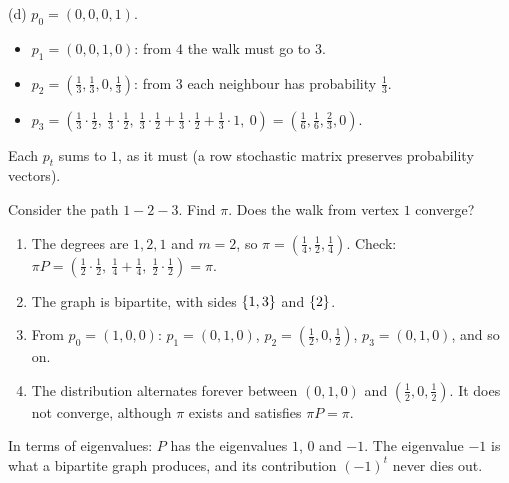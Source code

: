 \begin{exercisebox}
\begin{wsolution}
    (d) $p_0 = (0, 0, 0, 1)$.
    \begin{itemize}
        \item $p_1 = (0, 0, 1, 0)$: from $4$ the walk must go to $3$.
        \item $p_2 = \left(\frac{1}{3}, \frac{1}{3}, 0, \frac{1}{3}\right)$: from $3$ each
              neighbour has probability $\frac{1}{3}$.
        \item $p_3 = \left(\frac{1}{3} \cdot \frac{1}{2},\ \frac{1}{3} \cdot \frac{1}{2},\
                  \frac{1}{3} \cdot \frac{1}{2} + \frac{1}{3} \cdot \frac{1}{2} + \frac{1}{3} \cdot 1,\ 0\right)
                  = \left(\frac{1}{6}, \frac{1}{6}, \frac{2}{3}, 0\right)$.
    \end{itemize}
    Each $p_t$ sums to $1$, as it must (a row stochastic matrix preserves probability vectors).
\end{wsolution}
\end{exercisebox}

\begin{exercisebox}
\begin{pproblem}\label{pp:path}
    Consider the path $1 - 2 - 3$. Find $\pi$. Does the walk from vertex $1$ converge?
\end{pproblem}
\tcblower
\begin{wsolution}
    \leavevmode
    \begin{enumerate}
        \item The degrees are $1, 2, 1$ and $m = 2$, so
              $\pi = \left(\frac{1}{4}, \frac{1}{2}, \frac{1}{4}\right)$. Check:
              $\pi P = \left(\frac{1}{2} \cdot \frac{1}{2},\ \frac{1}{4} + \frac{1}{4},\ \frac{1}{2} \cdot \frac{1}{2}\right) = \pi$.
        \item The graph is bipartite, with sides $\left\lbrace1, 3\right\rbrace$ and $\left\lbrace2\right\rbrace$.
        \item From $p_0 = (1, 0, 0)$: $p_1 = (0, 1, 0)$,
              $p_2 = \left(\frac{1}{2}, 0, \frac{1}{2}\right)$, $p_3 = (0, 1, 0)$, and so on.
        \item The distribution alternates forever between $(0, 1, 0)$ and
              $\left(\frac{1}{2}, 0, \frac{1}{2}\right)$. It does not converge, although $\pi$
              exists and satisfies $\pi P = \pi$.
    \end{enumerate}
    In terms of eigenvalues: $P$ has the eigenvalues $1$, $0$ and $-1$. The eigenvalue $-1$ is what a
    bipartite graph produces, and its contribution $(-1)^t$ never dies out.
\end{wsolution}
\end{exercisebox}


